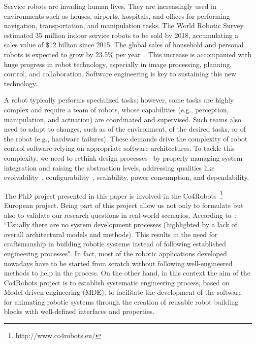 Service robots are invading human lives. They are increasingly used in environments such as houses, airports, hospitals, and offices for performing navigation, transportation, and manipulation tasks. 
The World Robotic Survey~\cite{wrs:online} estimated 35 million indoor service robots to be sold by 2018, accumulating a sales value of \$12 billion since 2015. 
The global sales of household and personal robots is expected to grow by 23.5\% per year~\cite{sheng:online}. 
This increase is accompanied with huge progress in robot technology, especially in image processing, planning, control, and collaboration. Software engineering is key to sustaining this new technology.

A robot typically performs specialized tasks; however, some tasks are highly complex and require a team of robots, whose capabilities (e.g., perception, manipulation, and actuation) are coordinated and supervised. 
Such teams also need to adapt to changes, such as of the environment, of the desired tasks, or of the robot (e.g., hardware failures). 
These demands drive the complexity of robot control software relying on appropriate software architectures. 
To tackle this complexity, we need to rethink design processes~\cite{Lee2008} by properly managing system integration and raising the abstraction levels, addressing qualities like evolvability~\cite{Perez2008}, configurability~\cite{Gamez2013563}, scalability, power consumption, and dependability.

The PhD project presented in this paper is involved in the Co4Robots~\footnote{http://www.co4robots.eu/} European project.
Being part of this project allow us not only to formulate but also to validate our research questions in real-world scenarios.
According to~\cite{roadmap}: ``Usually there are no system development processes (highlighted by a lack of overall architectural models and methods). 
This results in the need for craftsmanship in building robotic systems instead of following established engineering processes".
In fact, most of the robotic applications developed nowadays have to be started from scratch without following well-engineered methods to help in the process.
On the other hand, in this context the aim of the Co4Robots project is to establish systematic engineering process, based on Model-driven engineering (MDE), to facilitate the development of the software for animating robotic systems through the creation of reusable robot building blocks with well-defined interfaces and properties. 

